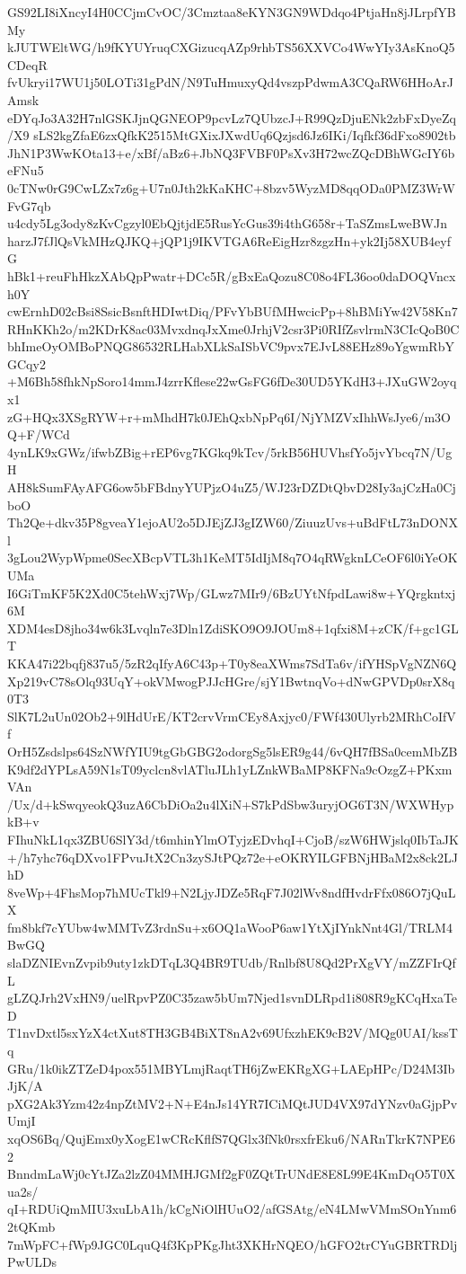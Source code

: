 GS92LI8iXncyI4H0CCjmCvOC/3Cmztaa8eKYN3GN9WDdqo4PtjaHn8jJLrpfYBMy
kJUTWEltWG/h9fKYUYruqCXGizucqAZp9rhbTS56XXVCo4WwYIy3AsKnoQ5CDeqR
fvUkryi17WU1j50LOTi31gPdN/N9TuHmuxyQd4vszpPdwmA3CQaRW6HHoArJAmsk
eDYqJo3A32H7nlGSKJjnQGNEOP9pcvLz7QUbzcJ+R99QzDjuENk2zbFxDyeZq/X9
sLS2kgZfaE6zxQfkK2515MtGXixJXwdUq6Qzjsd6Jz6IKi/Iqfkf36dFxo8902tb
JhN1P3WwKOta13+e/xBf/aBz6+JbNQ3FVBF0PsXv3H72wcZQcDBhWGcIY6beFNu5
0cTNw0rG9CwLZx7z6g+U7n0Jth2kKaKHC+8bzv5WyzMD8qqODa0PMZ3WrWFvG7qb
u4cdy5Lg3ody8zKvCgzyl0EbQjtjdE5RusYcGus39i4thG658r+TaSZmsLweBWJn
harzJ7fJlQsVkMHzQJKQ+jQP1j9IKVTGA6ReEigHzr8zgzHn+yk2Ij58XUB4eyfG
hBk1+reuFhHkzXAbQpPwatr+DCc5R/gBxEaQozu8C08o4FL36oo0daDOQVncxh0Y
cwErnhD02cBsi8SsicBsnftHDIwtDiq/PFvYbBUfMHwcicPp+8hBMiYw42V58Kn7
RHnKKh2o/m2KDrK8ac03MvxdnqJxXme0JrhjV2csr3Pi0RIfZsvlrmN3CIcQoB0C
bhImeOyOMBoPNQG86532RLHabXLkSaISbVC9pvx7EJvL88EHz89oYgwmRbYGCqy2
+M6Bh58fhkNpSoro14mmJ4zrrKflese22wGsFG6fDe30UD5YKdH3+JXuGW2oyqx1
zG+HQx3XSgRYW+r+mMhdH7k0JEhQxbNpPq6I/NjYMZVxIhhWsJye6/m3OQ+F/WCd
4ynLK9xGWz/ifwbZBig+rEP6vg7KGkq9kTcv/5rkB56HUVhsfYo5jvYbcq7N/UgH
AH8kSumFAyAFG6ow5bFBdnyYUPjzO4uZ5/WJ23rDZDtQbvD28Iy3ajCzHa0CjboO
Th2Qe+dkv35P8gveaY1ejoAU2o5DJEjZJ3gIZW60/ZiuuzUvs+uBdFtL73nDONXl
3gLou2WypWpme0SecXBcpVTL3h1KeMT5IdIjM8q7O4qRWgknLCeOF6l0iYeOKUMa
I6GiTmKF5K2Xd0C5tehWxj7Wp/GLwz7MIr9/6BzUYtNfpdLawi8w+YQrgkntxj6M
XDM4esD8jho34w6k3Lvqln7e3Dln1ZdiSKO9O9JOUm8+1qfxi8M+zCK/f+gc1GLT
KKA47i22bqfj837u5/5zR2qIfyA6C43p+T0y8eaXWms7SdTa6v/ifYHSpVgNZN6Q
Xp219vC78sOlq93UqY+okVMwogPJJcHGre/sjY1BwtnqVo+dNwGPVDp0srX8q0T3
SlK7L2uUn02Ob2+9lHdUrE/KT2crvVrmCEy8Axjyc0/FWf430Ulyrb2MRhCoIfVf
OrH5Zsdslps64SzNWfYIU9tgGbGBG2odorgSg5lsER9g44/6vQH7fBSa0cemMbZB
K9df2dYPLsA59N1sT09yclcn8vlATluJLh1yLZnkWBaMP8KFNa9cOzgZ+PKxmVAn
/Ux/d+kSwqyeokQ3uzA6CbDiOa2u4lXiN+S7kPdSbw3uryjOG6T3N/WXWHypkB+v
FIhuNkL1qx3ZBU6SlY3d/t6mhinYlmOTyjzEDvhqI+CjoB/szW6HWjslq0IbTaJK
+/h7yhc76qDXvo1FPvuJtX2Cn3zySJtPQz72e+eOKRYILGFBNjHBaM2x8ck2LJhD
8veWp+4FhsMop7hMUcTkl9+N2LjyJDZe5RqF7J02lWv8ndfHvdrFfx086O7jQuLX
fm8bkf7cYUbw4wMMTvZ3rdnSu+x6OQ1aWooP6aw1YtXjIYnkNnt4Gl/TRLM4BwGQ
slaDZNIEvnZvpib9uty1zkDTqL3Q4BR9TUdb/Rnlbf8U8Qd2PrXgVY/mZZFIrQfL
gLZQJrh2VxHN9/uelRpvPZ0C35zaw5bUm7Njed1svnDLRpd1i808R9gKCqHxaTeD
T1nvDxtl5sxYzX4ctXut8TH3GB4BiXT8nA2v69UfxzhEK9cB2V/MQg0UAI/kssTq
GRu/1k0ikZTZeD4pox551MBYLmjRaqtTH6jZwEKRgXG+LAEpHPc/D24M3IbJjK/A
pXG2Ak3Yzm42z4npZtMV2+N+E4nJs14YR7ICiMQtJUD4VX97dYNzv0aGjpPvUmjI
xqOS6Bq/QujEmx0yXogE1wCRcKflfS7QGlx3fNk0rsxfrEku6/NARnTkrK7NPE62
BnndmLaWj0cYtJZa2lzZ04MMHJGMf2gF0ZQtTrUNdE8E8L99E4KmDqO5T0Xua2s/
qI+RDUiQmMIU3xuLbA1h/kCgNiOlHUuO2/afGSAtg/eN4LMwVMmSOnYnm62tQKmb
7mWpFC+fWp9JGC0LquQ4f3KpPKgJht3XKHrNQEO/hGFO2trCYuGBRTRDljPwULDs
